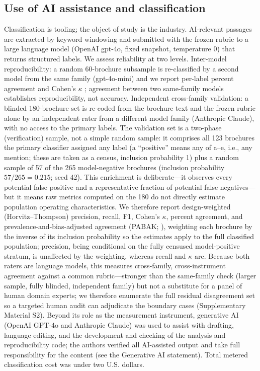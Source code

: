 \documentclass[utf8]{FrontiersinHarvard}
\begin{document}
\subsection{Use of AI assistance and classification}
Classification is tooling; the object of study is the industry. AI-relevant passages are extracted by keyword windowing and submitted with the frozen rubric to a large language model (OpenAI gpt-4o, fixed snapshot, temperature 0) that returns structured labels. We assess reliability at two levels. Inter-model reproducibility: a random 60-brochure subsample is re-classified by a second model from the same family (gpt-4o-mini) and we report per-label percent agreement and Cohen's $\kappa$ \citep{cohen1960}; agreement between two same-family models establishes reproducibility, not accuracy. Independent cross-family validation: a blinded 180-brochure set is re-coded from the brochure text and the frozen rubric alone by an independent rater from a different model family (Anthropic Claude), with no access to the primary labels. The validation set is a two-phase (verification) sample, not a simple random sample: it comprises all 123 brochures the primary classifier assigned any label (a ``positive'' means any of a--e, i.e., any mention; these are taken as a census, inclusion probability 1) plus a random sample of 57 of the 265 model-negative brochures (inclusion probability $57/265 = 0.215$; seed 42). This enrichment is deliberate---it observes every potential false positive and a representative fraction of potential false negatives---but it means raw metrics computed on the 180 do not directly estimate population operating characteristics. We therefore report design-weighted (Horvitz--Thompson) precision, recall, F1, Cohen's $\kappa$, percent agreement, and prevalence-and-bias-adjusted agreement (PABAK; \citealp{byrt1993}), weighting each brochure by the inverse of its inclusion probability so the estimates apply to the full classified population; precision, being conditional on the fully censused model-positive stratum, is unaffected by the weighting, whereas recall and $\kappa$ are. Because both raters are language models, this measures cross-family, cross-instrument agreement against a common rubric---stronger than the same-family check (larger sample, fully blinded, independent family) but not a substitute for a panel of human domain experts; we therefore enumerate the full residual disagreement set so a targeted human audit can adjudicate the boundary cases (Supplementary Material S2). Beyond its role as the measurement instrument, generative AI (OpenAI GPT-4o and Anthropic Claude) was used to assist with drafting, language editing, and the development and checking of the analysis and reproducibility code; the authors verified all AI-assisted output and take full responsibility for the content (see the Generative AI statement). Total metered classification cost was under two U.S. dollars.
\end{document}
